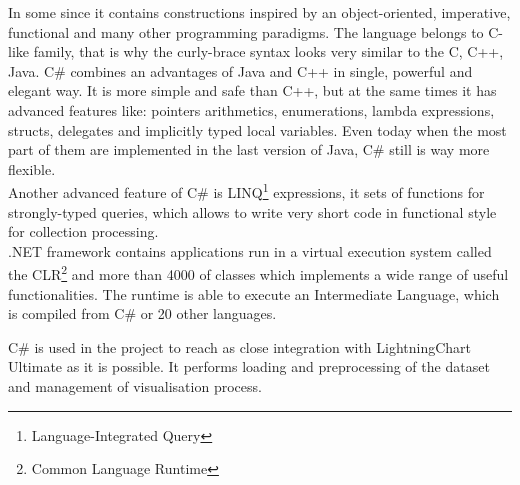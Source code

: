 \documentclass[twoside, english, 11pt]{report}
\begin{document}
In some since it contains constructions inspired by an object-oriented, imperative, functional and many other programming paradigms. The language belongs to C-like family, that is why the curly-brace syntax looks very similar to the C, C++, Java. C\# combines an advantages of Java and C++ in single, powerful and elegant way. It is more simple and safe than C++, but at the same times it has advanced features like: pointers arithmetics, enumerations, lambda expressions, structs, delegates and implicitly typed local variables. Even today when the most part of them are implemented in the last version of Java, C\# still is way more flexible.\\

Another advanced feature of C\# is  LINQ\footnote{Language-Integrated Query} expressions, it sets of functions for strongly-typed queries, which allows to write very short code in functional style for collection processing.\\

.NET framework contains applications run in a virtual execution system called the CLR\footnote{Common Language Runtime} and more than 4000 of classes which implements a wide range of useful functionalities. The runtime is able to execute an Intermediate Language, which is compiled from C\# or 20 other languages.

C\# is used in the project to reach as close integration with LightningChart Ultimate as it is possible. It performs loading and preprocessing of the dataset and management of visualisation process.
\end{document}
